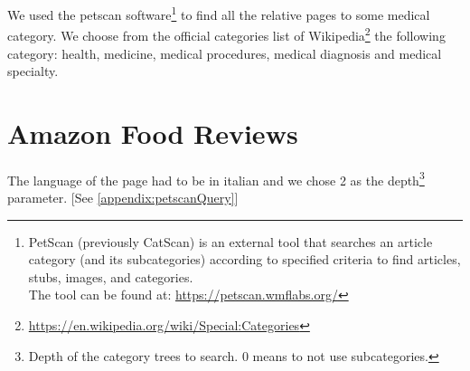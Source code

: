 We used the petscan software\footnote{PetScan (previously CatScan) is an external tool that searches an article category (and its subcategories) according to specified criteria to find articles, stubs, images, and categories.\\The tool can be found at: \url{https://petscan.wmflabs.org/}} to find all the relative pages to some medical category. We choose from the official categories list of Wikipedia\footnote{\url{https://en.wikipedia.org/wiki/Special:Categories}} the following category: health, medicine, medical procedures, medical diagnosis and medical specialty.

\section{Amazon Food Reviews}
The language of the page had to be in italian and we chose 2 as the depth\footnote{Depth of the category trees to search. 0 means to not use subcategories.} parameter. [See \ref{appendix:petscanQuery}]


